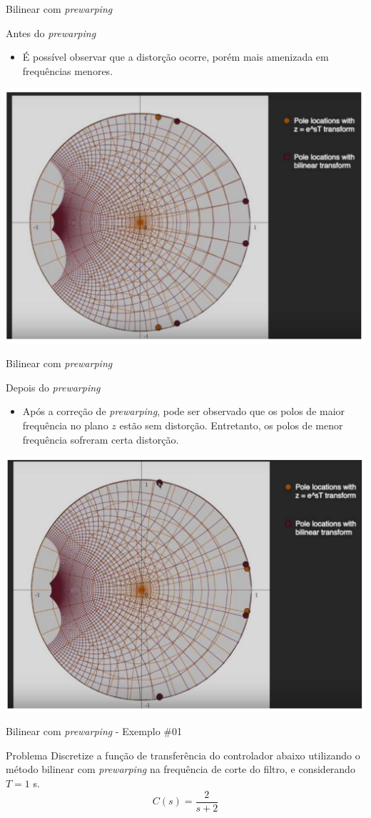 \begin{frame}{Bilinear com \textit{prewarping}}
\begin{block}{Antes do \textit{prewarping}}
\begin{itemize}
    \item É possível observar que a distorção ocorre, porém mais amenizada em frequências menores.
\end{itemize}
\end{block}
\centerline{\includegraphics[width=0.65\linewidth]{Figuras/Ch08/fig2.PNG}}
\end{frame}

\begin{frame}{Bilinear com \textit{prewarping}}
\begin{block}{Depois do \textit{prewarping}}
\begin{itemize}
    \item Após a correção de \textit{prewarping}, pode ser observado que os polos de maior frequência no plano $z$ estão sem distorção. Entretanto, os polos de menor frequência sofreram certa distorção. 
\end{itemize}
\end{block}
\centerline{\includegraphics[width=0.65\linewidth]{Figuras/Ch08/fig3.PNG}}
\end{frame}

\begin{frame}{Bilinear com \textit{prewarping} - Exemplo \#01}
\begin{block}{Problema}
Discretize a função de transferência do controlador abaixo utilizando o método bilinear com \textit{prewarping} na frequência de corte do filtro, e considerando $T= \num{1}$ s.
	\[ C(s)=\dfrac{2}{s+2} \]
\end{block}
\end{frame}

